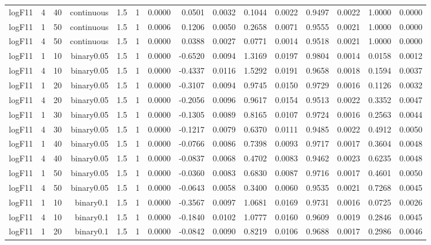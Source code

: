 \begin{longtable}{rrrrrrrrrrrrrrr}
  logF11 & 4 & 40 & continuous & 1.5 & 1 & 0.0000 & 0.0501 & 0.0032 & 0.1044 & 0.0022 & 0.9497 & 0.0022 & 1.0000 & 0.0000 \\ 
  logF11 & 1 & 50 & continuous & 1.5 & 1 & 0.0006 & 0.1206 & 0.0050 & 0.2658 & 0.0071 & 0.9555 & 0.0021 & 1.0000 & 0.0000 \\ 
  logF11 & 4 & 50 & continuous & 1.5 & 1 & 0.0000 & 0.0388 & 0.0027 & 0.0771 & 0.0014 & 0.9518 & 0.0021 & 1.0000 & 0.0000 \\ 
  logF11 & 1 & 10 & binary0.05 & 1.5 & 1 & 0.0000 & -0.6520 & 0.0094 & 1.3169 & 0.0197 & 0.9804 & 0.0014 & 0.0158 & 0.0012 \\ 
  logF11 & 4 & 10 & binary0.05 & 1.5 & 1 & 0.0000 & -0.4337 & 0.0116 & 1.5292 & 0.0191 & 0.9658 & 0.0018 & 0.1594 & 0.0037 \\ 
  logF11 & 1 & 20 & binary0.05 & 1.5 & 1 & 0.0000 & -0.3107 & 0.0094 & 0.9745 & 0.0150 & 0.9729 & 0.0016 & 0.1126 & 0.0032 \\ 
  logF11 & 4 & 20 & binary0.05 & 1.5 & 1 & 0.0000 & -0.2056 & 0.0096 & 0.9617 & 0.0154 & 0.9513 & 0.0022 & 0.3352 & 0.0047 \\ 
  logF11 & 1 & 30 & binary0.05 & 1.5 & 1 & 0.0000 & -0.1305 & 0.0089 & 0.8165 & 0.0107 & 0.9724 & 0.0016 & 0.2563 & 0.0044 \\ 
  logF11 & 4 & 30 & binary0.05 & 1.5 & 1 & 0.0000 & -0.1217 & 0.0079 & 0.6370 & 0.0111 & 0.9485 & 0.0022 & 0.4912 & 0.0050 \\ 
  logF11 & 1 & 40 & binary0.05 & 1.5 & 1 & 0.0000 & -0.0766 & 0.0086 & 0.7398 & 0.0093 & 0.9717 & 0.0017 & 0.3604 & 0.0048 \\ 
  logF11 & 4 & 40 & binary0.05 & 1.5 & 1 & 0.0000 & -0.0837 & 0.0068 & 0.4702 & 0.0083 & 0.9462 & 0.0023 & 0.6235 & 0.0048 \\ 
  logF11 & 1 & 50 & binary0.05 & 1.5 & 1 & 0.0000 & -0.0360 & 0.0083 & 0.6830 & 0.0087 & 0.9716 & 0.0017 & 0.4601 & 0.0050 \\ 
  logF11 & 4 & 50 & binary0.05 & 1.5 & 1 & 0.0000 & -0.0643 & 0.0058 & 0.3400 & 0.0060 & 0.9535 & 0.0021 & 0.7268 & 0.0045 \\ 
  logF11 & 1 & 10 & binary0.1 & 1.5 & 1 & 0.0000 & -0.3567 & 0.0097 & 1.0681 & 0.0169 & 0.9731 & 0.0016 & 0.0725 & 0.0026 \\ 
  logF11 & 4 & 10 & binary0.1 & 1.5 & 1 & 0.0000 & -0.1840 & 0.0102 & 1.0777 & 0.0160 & 0.9609 & 0.0019 & 0.2846 & 0.0045 \\ 
  logF11 & 1 & 20 & binary0.1 & 1.5 & 1 & 0.0000 & -0.0842 & 0.0090 & 0.8219 & 0.0106 & 0.9688 & 0.0017 & 0.2986 & 0.0046 \\ 

\end{longtable}
